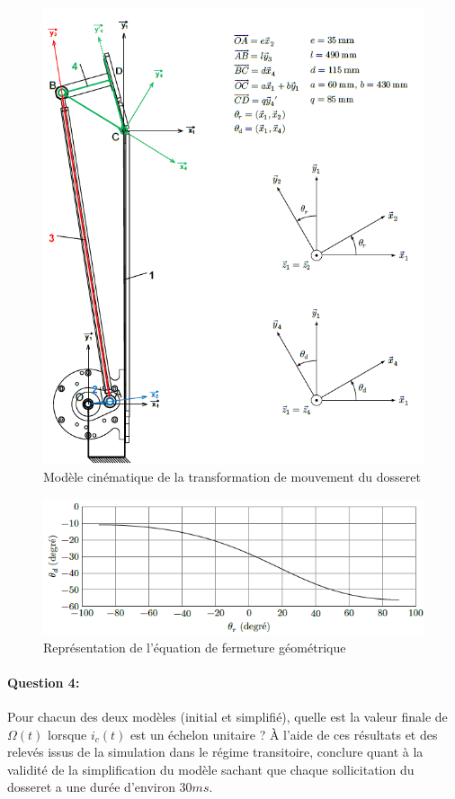 \newpage

\begin{figure}[!ht]
\begin{center}
 \includegraphics[width=0.7\linewidth]{img/img09}
\end{center}
\caption{Modèle cinématique de la transformation de mouvement du dosseret}
\label{fig8}
\end{figure}

\begin{figure}[!ht]
\begin{center}
 \includegraphics[width=0.7\linewidth]{img/img10}
\end{center}
\caption{Représentation de l'équation de fermeture géométrique}
\label{fig9}
\end{figure}

\paragraph{Question 4:}	Pour chacun des deux modèles (initial et simplifié), quelle est la valeur finale de $\Omega(t)$ lorsque $i_c(t)$ est un échelon unitaire ? À l'aide de ces résultats et des relevés issus de la simulation dans le régime transitoire, conclure quant à la validité de la simplification du modèle sachant que chaque sollicitation du dosseret a une durée d'environ $30 ms$.

